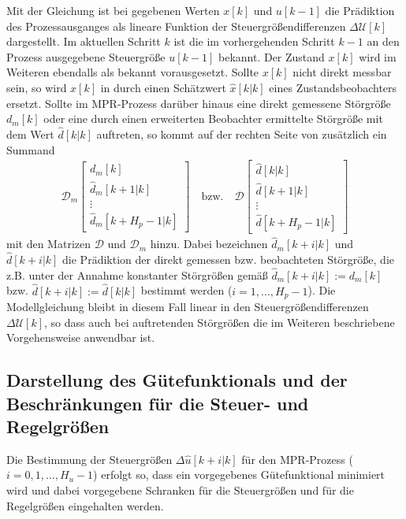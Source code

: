 Mit der Gleichung  ist bei gegebenen Werten $x[k]$ und $u[k-1]$ die Prädiktion des Prozessausganges
als lineare Funktion der Steuergrößendifferenzen $\Delta\mathcal{U}[k]$ dargestellt. Im aktuellen Schritt $k$ ist die im vorhergehenden Schritt $k-1$
an den Prozess ausgegebene Steuergröße $u[k-1]$ bekannt. Der Zustand $x[k]$ wird im Weiteren ebendalls als bekannt vorausgesetzt. Sollte $x[k]$ nicht
direkt messbar sein, so wird $x[k]$ in  durch einen Schätzwert $\hat{x}[k|k]$ eines
Zustandsbeobachters ersetzt. Sollte im \ac{MPR}-Prozess  darüber hinaus eine direkt gemessene Störgröße $d_m[k]$
oder eine durch einen erweiterten Beobachter ermittelte Störgröße mit dem Wert $\hat{d}[k|k]$ auftreten, so kommt auf der rechten Seite von
 zusätzlich ein Summand
\begin{align*}
	\mathcal{D}_m\begin{bmatrix}
	d_m[k]\\ \hat{d}_m[k+1|k]\\ \vdots \\ \hat{d}_m[k+H_p-1|k]
	\end{bmatrix}\quad\text{bzw.}\quad \mathcal{D}\begin{bmatrix}
	\hat{d}[k|k]\\ \hat{d}[k+1|k]\\ \vdots\\ \hat{d}[k+H_p-1|k]
	\end{bmatrix}
\end{align*}
mit den Matrizen $\mathcal{D}$ und $\mathcal{D}_m$ hinzu. Dabei bezeichnen $\hat{d}_m[k+i|k]$ und $\hat{d}[k+i|k]$ die Prädiktion der direkt gemessen bzw. beobachteten Störgröße, die
z.B. unter der Annahme konstanter Störgrößen gemäß $\hat{d}_m[k+i|k]:=d_m[k]$ bzw. $\hat{d}[k+i|k]:=\hat{d}[k|k]$ bestimmt werden ($i=1,\ldots,H_p-1$). Die Modellgleichung
 bleibt in diesem Fall linear in den Steuergrößendifferenzen $\Delta\mathcal{U}[k]$, so dass auch bei auftretenden Störgrößen die im
Weiteren beschriebene Vorgehensweise anwendbar ist.

\subsection{Darstellung des Gütefunktionals und der Beschränkungen für die Steuer- und Regelgrößen}
Die Bestimmung der Steuergrößen $\Delta\hat{u}[k+i|k]$ für den \ac{MPR}-Prozess ($i=0,1,\ldots,H_u-1$) erfolgt so, dass ein vorgegebenes Gütefunktional minimiert wird und dabei
vorgegebene Schranken für die Steuergrößen und für die Regelgrößen eingehalten werden.

